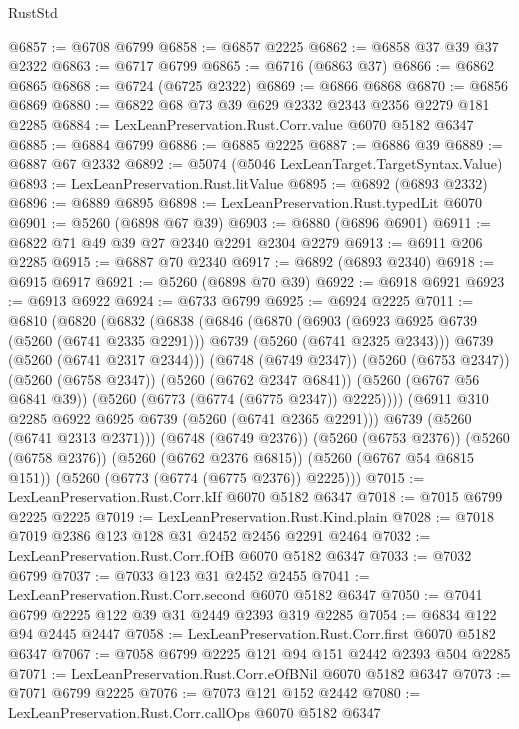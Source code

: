 \begin{lexlean}{RustStd}
\begin{coremodule}
@6857 := @6708 @6799
@6858 := @6857 @2225
@6862 := @6858 @37 @39 @37 @2322
@6863 := @6717 @6799
@6865 := @6716 (@6863 @37)
@6866 := @6862 @6865
@6868 := @6724 (@6725 @2322)
@6869 := @6866 @6868
@6870 := @6856 @6869
@6880 := @6822 @68 @73 @39 @629 @2332 @2343 @2356 @2279 @181 @2285
@6884 := LexLeanPreservation.Rust.Corr.value @6070 @5182 @6347
@6885 := @6884 @6799
@6886 := @6885 @2225
@6887 := @6886 @39
@6889 := @6887 @67 @2332
@6892 := @5074 (@5046 LexLeanTarget.TargetSyntax.Value)
@6893 := LexLeanPreservation.Rust.litValue
@6895 := @6892 (@6893 @2332)
@6896 := @6889 @6895
@6898 := LexLeanPreservation.Rust.typedLit @6070
@6901 := @5260 (@6898 @67 @39)
@6903 := @6880 (@6896 @6901)
@6911 := @6822 @71 @49 @39 @27 @2340 @2291 @2304 @2279
@6913 := @6911 @206 @2285
@6915 := @6887 @70 @2340
@6917 := @6892 (@6893 @2340)
@6918 := @6915 @6917
@6921 := @5260 (@6898 @70 @39)
@6922 := @6918 @6921
@6923 := @6913 @6922
@6924 := @6733 @6799
@6925 := @6924 @2225
@7011 := @6810
    (@6820
      (@6832
        (@6838
          (@6846
            (@6870
              (@6903
                (@6923 @6925 @6739 (@5260 (@6741 @2335 @2291)))
                @6739
                (@5260 (@6741 @2325 @2343)))
              @6739
              (@5260 (@6741 @2317 @2344)))
            (@6748 (@6749 @2347))
            (@5260 (@6753 @2347))
            (@5260 (@6758 @2347))
            (@5260 (@6762 @2347 @6841))
            (@5260 (@6767 @56 @6841 @39))
            (@5260 (@6773 (@6774 (@6775 @2347)) @2225))))
        (@6911 @310 @2285 @6922 @6925 @6739 (@5260 (@6741 @2365 @2291)))
        @6739
        (@5260 (@6741 @2313 @2371)))
      (@6748 (@6749 @2376))
      (@5260 (@6753 @2376))
      (@5260 (@6758 @2376))
      (@5260 (@6762 @2376 @6815))
      (@5260 (@6767 @54 @6815 @151))
      (@5260 (@6773 (@6774 (@6775 @2376)) @2225)))
@7015 := LexLeanPreservation.Rust.Corr.kIf @6070 @5182 @6347
@7018 := @7015 @6799 @2225 @2225
@7019 := LexLeanPreservation.Rust.Kind.plain
@7028 := @7018 @7019 @2386 @123 @128 @31 @2452 @2456 @2291 @2464
@7032 := LexLeanPreservation.Rust.Corr.fOfB @6070 @5182 @6347
@7033 := @7032 @6799
@7037 := @7033 @123 @31 @2452 @2455
@7041 := LexLeanPreservation.Rust.Corr.second @6070 @5182 @6347
@7050 := @7041 @6799 @2225 @122 @39 @31 @2449 @2393 @319 @2285
@7054 := @6834 @122 @94 @2445 @2447
@7058 := LexLeanPreservation.Rust.Corr.first @6070 @5182 @6347
@7067 := @7058 @6799 @2225 @121 @94 @151 @2442 @2393 @504 @2285
@7071 := LexLeanPreservation.Rust.Corr.eOfBNil @6070 @5182 @6347
@7073 := @7071 @6799 @2225
@7076 := @7073 @121 @152 @2442
@7080 := LexLeanPreservation.Rust.Corr.callOps @6070 @5182 @6347

\end{coremodule}
\end{lexlean}
